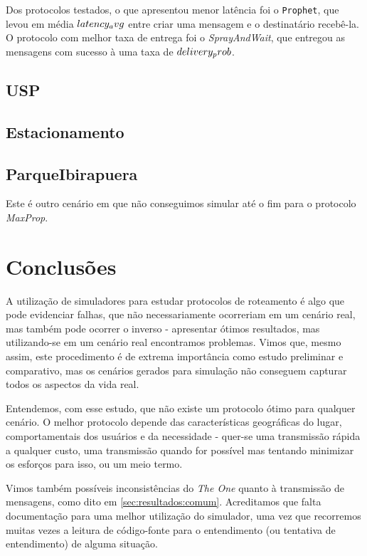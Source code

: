 \documentclass[conference]{IEEEtran}
\begin{document}
Dos protocolos testados, o que apresentou menor latência foi o \texttt{Prophet}, que levou em média $\reportval{CentroSP}{Prophet}{latency_avg}$ entre criar uma mensagem e o destinatário recebê-la. O protocolo com melhor taxa de entrega foi o \textit{SprayAndWait}, que entregou as mensagens com sucesso à uma taxa de $\reportval{CentroSP}{SprayAndWait}{delivery_prob}$.

\subsection{USP}


\subsection{Estacionamento}
\subsection{ParqueIbirapuera}
Este é outro cenário em que não conseguimos simular até o fim para o protocolo \emph{MaxProp}.

\section{Conclusões}
A utilização de simuladores para estudar protocolos de roteamento é algo que pode evidenciar falhas, que não necessariamente ocorreriam em um cenário real, mas também pode ocorrer o inverso - apresentar ótimos resultados, mas utilizando-se em um cenário real encontramos problemas. Vimos que, mesmo assim, este procedimento é de extrema importância como estudo preliminar e comparativo, mas os cenários gerados para simulação não conseguem capturar todos os aspectos da vida real.

Entendemos, com esse estudo, que não existe um protocolo ótimo para qualquer cenário. O melhor protocolo depende das características geográficas do lugar, comportamentais dos usuários e da necessidade - quer-se uma transmissão rápida a qualquer custo, uma transmissão quando for possível mas tentando minimizar os esforços para isso, ou um meio termo.

Vimos também possíveis inconsistências do \emph{The One} quanto à transmissão de mensagens, como dito em \ref{sec:resultados:comum}. 
Acreditamos que falta documentação para uma melhor utilização do simulador, uma vez que recorremos muitas vezes a leitura de código-fonte para o entendimento (ou tentativa de entendimento) de alguma situação.
\end{document}
